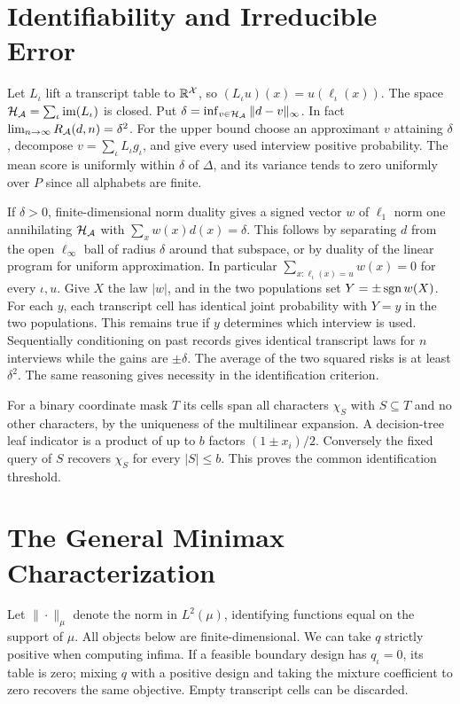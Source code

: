 \section{Identifiability and Irreducible Error}\label{app:id}
Let $L_\iota$ lift a transcript table to $\mathbb R^{\mathcal X}$, so $(L_\iota u)(x)=u(\ell_\iota(x))$. The space $\mathcal H_\mathcal A=\sum_\iota\mathrm{im}(L_\iota)$ is closed. Put $\delta=\inf_{v\in\mathcal H_\mathcal A}\|d-v\|_\infty$. In fact $\lim_{n\to\infty} R_\mathcal A(d,n)=\delta^2$. For the upper bound choose an approximant $v$ attaining $\delta$, decompose $v=\sum_\iota L_\iota g_\iota$, and give every used interview positive probability. The mean score is uniformly within $\delta$ of $\Delta$, and its variance tends to zero uniformly over $P$ since all alphabets are finite.

If $\delta>0$, finite-dimensional norm duality gives a signed vector $w$ of $\ell_1$ norm one annihilating $\mathcal H_\mathcal A$ with $\sum_xw(x)d(x)=\delta$. This follows by separating $d$ from the open $\ell_\infty$ ball of radius $\delta$ around that subspace, or by duality of the linear program for uniform approximation. In particular $\sum_{x:\ell_\iota(x)=u} w(x)=0$ for every $\iota,u$. Give $X$ the law $|w|$, and in the two populations set $Y=\pm\operatorname{sgn} w(X)$. For each $y$, each transcript cell has identical joint probability with $Y=y$ in the two populations. This remains true if $y$ determines which interview is used. Sequentially conditioning on past records gives identical transcript laws for $n$ interviews while the gains are $\pm\delta$. The average of the two squared risks is at least $\delta^2$. The same reasoning gives necessity in the identification criterion.

For a binary coordinate mask $T$ its cells span all characters $\chi_S$ with $S\subseteq T$ and no other characters, by the uniqueness of the multilinear expansion. A decision-tree leaf indicator is a product of up to $b$ factors $(1\pm x_i)/2$. Conversely the fixed query of $S$ recovers $\chi_S$ for every $|S|\le b$. This proves the common identification threshold.

\section{The General Minimax Characterization}\label{app:general}
Let $\|\cdot\|_\mu$ denote the norm in $L^2(\mu)$, identifying functions equal on the support of $\mu$. All objects below are finite-dimensional. We can take $q$ strictly positive when computing infima. If a feasible boundary design has $q_\iota=0$, its table is zero; mixing $q$ with a positive design and taking the mixture coefficient to zero recovers the same objective. Empty transcript cells can be discarded.

